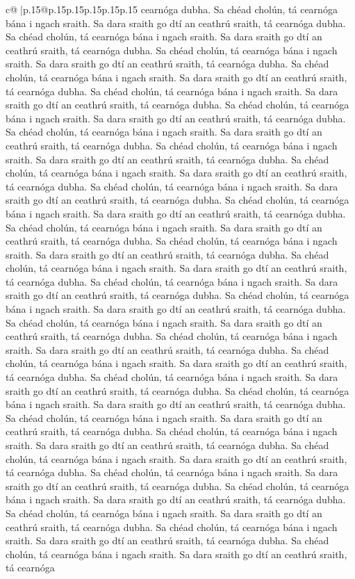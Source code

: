 \documentclass{article}
\begin{document}
{\begin{supertabular}{c@{$\;$}|p{.15\linewidth}@{}p{.15\linewidth}p{.15\linewidth}p{.15\linewidth}p{.15\linewidth}p{.15\linewidth}}
{{{cearnóga dubha. Sa chéad cholún, tá cearnóga bána i ngach sraith. Sa dara sraith go dtí an ceathrú sraith, tá cearnóga dubha. Sa chéad cholún, tá cearnóga bána i ngach sraith. Sa dara sraith go dtí an ceathrú sraith, tá cearnóga dubha. Sa chéad cholún, tá cearnóga bána i ngach sraith. Sa dara sraith go dtí an ceathrú sraith, tá cearnóga dubha. Sa chéad cholún, tá cearnóga bána i ngach sraith. Sa dara sraith go dtí an ceathrú sraith, tá cearnóga dubha. Sa chéad cholún, tá cearnóga bána i ngach sraith. Sa dara sraith go dtí an ceathrú sraith, tá cearnóga dubha. Sa chéad cholún, tá cearnóga bána i ngach sraith. Sa dara sraith go dtí an ceathrú sraith, tá cearnóga dubha. Sa chéad cholún, tá cearnóga bána i ngach sraith. Sa dara sraith go dtí an ceathrú sraith, tá cearnóga dubha. Sa chéad cholún, tá cearnóga bána i ngach sraith. Sa dara sraith go dtí an ceathrú sraith, tá cearnóga dubha. Sa chéad cholún, tá cearnóga bána i ngach sraith. Sa dara sraith go dtí an ceathrú sraith, tá cearnóga dubha. Sa chéad cholún, tá cearnóga bána i ngach sraith. Sa dara sraith go dtí an ceathrú sraith, tá cearnóga dubha. Sa chéad cholún, tá cearnóga bána i ngach sraith. Sa dara sraith go dtí an ceathrú sraith, tá cearnóga dubha. Sa chéad cholún, tá cearnóga bána i ngach sraith. Sa dara sraith go dtí an ceathrú sraith, tá cearnóga dubha. Sa chéad cholún, tá cearnóga bána i ngach sraith. Sa dara sraith go dtí an ceathrú sraith, tá cearnóga dubha. Sa chéad cholún, tá cearnóga bána i ngach sraith. Sa dara sraith go dtí an ceathrú sraith, tá cearnóga dubha. Sa chéad cholún, tá cearnóga bána i ngach sraith. Sa dara sraith go dtí an ceathrú sraith, tá cearnóga dubha. Sa chéad cholún, tá cearnóga bána i ngach sraith. Sa dara sraith go dtí an ceathrú sraith, tá cearnóga dubha. Sa chéad cholún, tá cearnóga bána i ngach sraith. Sa dara sraith go dtí an ceathrú sraith, tá cearnóga dubha. Sa chéad cholún, tá cearnóga bána i ngach sraith. Sa dara sraith go dtí an ceathrú sraith, tá cearnóga dubha. Sa chéad cholún, tá cearnóga bána i ngach sraith. Sa dara sraith go dtí an ceathrú sraith, tá cearnóga dubha. Sa chéad cholún, tá cearnóga bána i ngach sraith. Sa dara sraith go dtí an ceathrú sraith, tá cearnóga dubha. Sa chéad cholún, tá cearnóga bána i ngach sraith. Sa dara sraith go dtí an ceathrú sraith, tá cearnóga dubha. Sa chéad cholún, tá cearnóga bána i ngach sraith. Sa dara sraith go dtí an ceathrú sraith, tá cearnóga dubha. Sa chéad cholún, tá cearnóga bána i ngach sraith. Sa dara sraith go dtí an ceathrú sraith, tá cearnóga dubha. Sa chéad cholún, tá cearnóga bána i ngach sraith. Sa dara sraith go dtí an ceathrú sraith, tá cearnóga dubha. Sa chéad cholún, tá cearnóga bána i ngach sraith. Sa dara sraith go dtí an ceathrú sraith, tá cearnóga dubha. Sa chéad cholún, tá cearnóga bána i ngach sraith. Sa dara sraith go dtí an ceathrú sraith, tá cearnóga dubha. Sa chéad cholún, tá cearnóga bána i ngach sraith. Sa dara sraith go dtí an ceathrú sraith, tá cearnóga dubha. Sa chéad cholún, tá cearnóga bána i ngach sraith. Sa dara sraith go dtí an ceathrú sraith, tá cearnóga dubha. Sa chéad cholún, tá cearnóga bána i ngach sraith. Sa dara sraith go dtí an ceathrú sraith, tá cearnóga }}}
\end{supertabular}}
\end{document}

